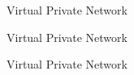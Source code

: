 \documentclass{beamer}
\begin{document}
  {
    \begin{frame}{Virtual Private Network}
    \end{frame}
  }
  {
    \begin{frame}{Virtual Private Network}
    \end{frame}
  }
  {
    \begin{frame}{Virtual Private Network}
    \end{frame}
  }
\end{document}
